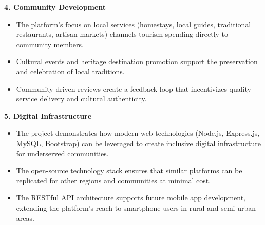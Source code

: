 \textbf{4. Community Development}
\begin{itemize}[leftmargin=2em]
    \item The platform's focus on local services (homestays, local guides, traditional restaurants, artisan markets) channels tourism spending directly to community members.
    \item Cultural events and heritage destination promotion support the preservation and celebration of local traditions.
    \item Community-driven reviews create a feedback loop that incentivizes quality service delivery and cultural authenticity.
\end{itemize}

\textbf{5. Digital Infrastructure}
\begin{itemize}[leftmargin=2em]
    \item The project demonstrates how modern web technologies (Node.js, Express.js, MySQL, Bootstrap) can be leveraged to create inclusive digital infrastructure for underserved communities.
    \item The open-source technology stack ensures that similar platforms can be replicated for other regions and communities at minimal cost.
    \item The RESTful API architecture supports future mobile app development, extending the platform's reach to smartphone users in rural and semi-urban areas.
\end{itemize}
